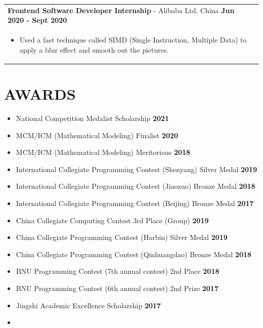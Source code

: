 \documentclass[a4paper,12pt]{article}
\begin{document}
\begin{tabularx}{\linewidth}{ @{}l r@{} }
\textbf{Frontend Software Developer Internship} - Alibaba Ltd. China \hfill \textbf{Jun 2020 - Sept 2020} \\[4pt]
\begin{minipage}[t]{\linewidth}
    \begin{itemize}[nosep,after=\strut, leftmargin=1em, itemsep=2pt]
        \item Used a fast technique called SIMD (Single Instruction, Multiple Data) to apply a blur effect and smooth out the pictures.
    \end{itemize}
\end{minipage}
\end{tabularx}

\hfill
\section{\textbf{AWARDS}}
\begin{minipage}[t]{\linewidth}
\begin{itemize}[nosep,after=\strut, leftmargin=1em, itemsep=2pt]
    \item National Competition Medalist Scholarship \hfill \textbf{2021}
    \item MCM/ICM (Mathematical Modeling) Finalist \hfill \textbf{2020}
    \item MCM/ICM (Mathematical Modeling) Meritorious \hfill \textbf{2018}
    \item International Collegiate Programming Contest (Shenyang) Silver Medal  \hfill \textbf{2019}
    \item International Collegiate Programming Contest (Jiaozuo) Bronze Medal \hfill \textbf{2018} 
    \item International Collegiate Programming Contest (Beijing) Bronze Medal \hfill \textbf{2017} 
    \item China Collegiate Computing Contest 3rd Place (Group) \hfill \textbf{2019}
    \item China Collegiate Programming Contest (Harbin) Silver Medal \hfill \textbf{2019} 
    \item China Collegiate Programming Contest (Qinhuangdao) Bronze Medal \hfill \textbf{2018} 
    \item BNU Programming Contest (7th annual contest) 2nd Place \hfill \textbf{2018} 
    \item BNU Programming Contest (6th annual contest) 2nd Prize \hfill \textbf{2017}
    \item Jingshi Academic Excellence Scholarship \hfill \textbf{2017}
    \item[] 
\end{itemize}
\end{minipage}
\end{document}
